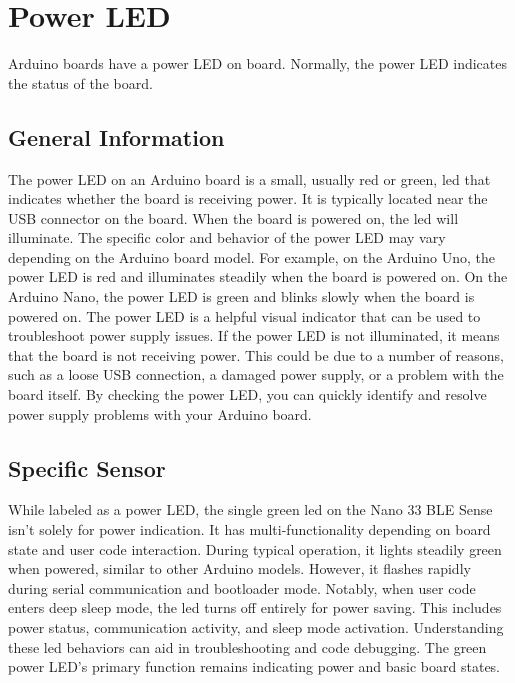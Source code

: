 %
%



\chapter{Power LED}

Arduino boards have a power LED on board. Normally, the power LED indicates the status of the board.

\section{General Information}

The power LED on an Arduino board is a small, usually red or green, \ac{led} that indicates whether the board is receiving power.
It is typically located near the USB connector on the board. When the board is powered on, the \ac{led} will illuminate.
The specific color and behavior of the power LED may vary depending on the Arduino board model.
For example, on the Arduino Uno, the power LED is red and illuminates steadily when the board is powered on.
On the Arduino Nano, the power LED is green and blinks slowly when the board is powered on.
The power LED is a helpful visual indicator that can be used to troubleshoot power supply issues.
If the power LED is not illuminated, it means that the board is not receiving power.
This could be due to a number of reasons, such as a loose USB connection, a damaged power supply, or a problem with the board itself.
By checking the power LED, you can quickly identify and resolve power supply problems with your Arduino board.


\section{Specific Sensor}

While labeled as a power LED, the single green \ac{led} on the Nano 33 BLE Sense isn't solely for power indication. It has multi-functionality depending on board state and user code interaction. During typical operation, it lights steadily green when powered, similar to other Arduino models.
However, it flashes rapidly during serial communication and bootloader mode.
Notably, when user code enters deep sleep mode, the \ac{led} turns off entirely for power saving. This includes power status, communication activity, and sleep mode activation.
Understanding these \ac{led} behaviors can aid in troubleshooting and code debugging.
The green power LED's primary function remains indicating power and basic board states.


